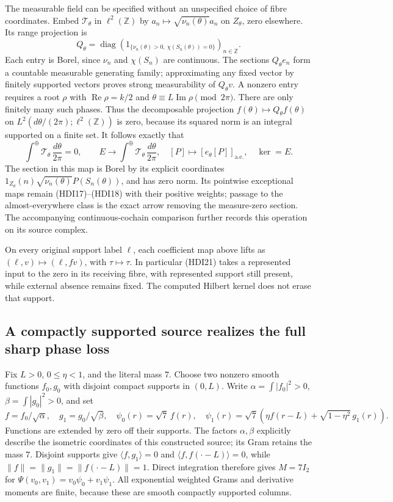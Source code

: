 \documentclass{article}
\begin{document}
The measurable field can be specified without an unspecified
choice of fibre coordinates. Embed \(\mathcal T_\theta\) in
\(\ell^2(\mathbb Z)\) by \(a_n\mapsto\sqrt{\nu_n(\theta)}a_n\)
on \(Z_\theta\), zero elsewhere. Its range projection is
\[
 Q_\theta=\operatorname{diag}\!
 \left(1_{\{\nu_n(\theta)>0,\ \chi(S_n(\theta))=0\}}\right)_{n\in\mathbb Z}.
 \tag{HDI20}
\]
Each entry is Borel, since \(\nu_n\) and \(\chi(S_n)\) are
continuous. The sections \(Q_\theta e_n\) form a countable
measurable generating family; approximating any fixed vector
by finitely supported vectors proves strong measurability of
\(Q_\theta v\). A nonzero entry requires a root \(\rho\) with
\(\operatorname{Re}\rho=k/2\) and
\(\theta\equiv L\operatorname{Im}\rho\pmod{2\pi}\).
There are only finitely many such phases. Thus the decomposable
projection \(f(\theta)\mapsto Q_\theta f(\theta)\) on
\(L^2(d\theta/(2\pi);\ell^2(\mathbb Z))\) is zero, because its
squared norm is an integral supported on a finite set.
It follows exactly that
\[
 \int^\oplus\mathcal T_\theta\,\frac{d\theta}{2\pi}=0,\qquad
 E\longrightarrow\int^\oplus\mathcal T_\theta\,\frac{d\theta}{2\pi},
 \quad[P]\mapsto[e_\theta[P]]_{\mathrm{a.e.}},
 \quad\ker=E.
 \tag{HDI21}
\]
The section in this map is Borel by its explicit coordinates
\(1_{Z_\theta}(n)\sqrt{\nu_n(\theta)}P(S_n(\theta))\), and has
zero norm. Its pointwise exceptional maps remain (HDI17)--(HDI18)
with their positive weights; passage to the almost-everywhere
class is the exact arrow removing the measure-zero section.
The accompanying continuous-cochain comparison further records
this operation on its source complex.

On every original support label \(\ell\), each coefficient map
above lifts as \((\ell,v)\mapsto(\ell,fv)\), with
\(\tau\mapsto\tau\). In particular (HDI21) takes a represented
input to the zero in its receiving fibre, with represented
support still present, while external absence remains fixed.
The computed Hilbert kernel does not erase that support.

\subsection{A compactly supported source realizes the full sharp phase loss}
Fix \(L>0\), \(0\le\eta<1\), and the literal mass \(7\).
Choose two nonzero smooth functions \(f_0,g_0\) with disjoint
compact supports in \((0,L)\). Write
\(\alpha=\int|f_0|^2>0\), \(\beta=\int|g_0|^2>0\), and set
\[
 f=f_0/\sqrt\alpha,\quad g_1=g_0/\sqrt\beta,\quad
 \psi_0(r)=\sqrt7\,f(r),\quad
 \psi_1(r)=\sqrt7\left(\eta f(r-L)+\sqrt{1-\eta^2}\,g_1(r)\right).
 \tag{HDI22}
\]
Functions are extended by zero off their supports. The factors
\(\alpha,\beta\) explicitly describe the isometric coordinates
of this constructed source; its Gram retains the mass \(7\).
Disjoint supports give \(\langle f,g_1\rangle=0\) and
\(\langle f,f(\cdot-L)\rangle=0\), while
\(\|f\|=\|g_1\|=\|f(\cdot-L)\|=1\).
Direct integration therefore gives \(M=7I_2\) for
\(\Psi(v_0,v_1)=v_0\psi_0+v_1\psi_1\).
All exponential weighted Grams and derivative moments are
finite, because these are smooth compactly supported columns.
\end{document}
